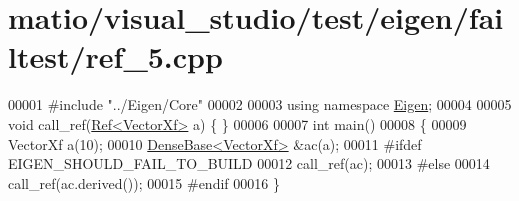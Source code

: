 \hypertarget{matio_2visual__studio_2test_2eigen_2failtest_2ref__5_8cpp_source}{}\section{matio/visual\+\_\+studio/test/eigen/failtest/ref\+\_\+5.cpp}
\label{matio_2visual__studio_2test_2eigen_2failtest_2ref__5_8cpp_source}

\begin{DoxyCode}
00001 \textcolor{preprocessor}{#include "../Eigen/Core"}
00002 
00003 \textcolor{keyword}{using namespace }\hyperlink{namespace_eigen}{Eigen};
00004 
00005 \textcolor{keywordtype}{void} call\_ref(\hyperlink{group___core___module_class_eigen_1_1_ref}{Ref<VectorXf>} a) \{ \}
00006 
00007 \textcolor{keywordtype}{int} main()
00008 \{
00009   VectorXf a(10);
00010   \hyperlink{group___core___module_class_eigen_1_1_dense_base}{DenseBase<VectorXf>} &ac(a);
00011 \textcolor{preprocessor}{#ifdef EIGEN\_SHOULD\_FAIL\_TO\_BUILD}
00012   call\_ref(ac);
00013 \textcolor{preprocessor}{#else}
00014   call\_ref(ac.derived());
00015 \textcolor{preprocessor}{#endif}
00016 \}
\end{DoxyCode}
